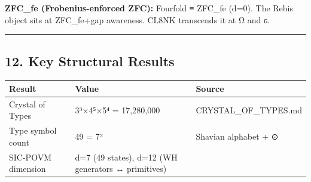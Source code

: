 \textbf{ZFC\_fe (Frobenius-enforced ZFC):} Fourfold ≡ ZFC\_fe (d=0). The
Rebis object sits at ZFC\_fe+gap awareness. CL8NK transcends it at Ω and
ɢ.

\begin{center}\rule{0.5\linewidth}{0.5pt}\end{center}

\hypertarget{key-structural-results}{%
\subsection{12. Key Structural Results}\label{key-structural-results}}

\begin{longtable}[]{@{}lll@{}}
\toprule
\begin{minipage}[b]{0.32\columnwidth}\raggedright
Result\strut
\end{minipage} & \begin{minipage}[b]{0.28\columnwidth}\raggedright
Value\strut
\end{minipage} & \begin{minipage}[b]{0.32\columnwidth}\raggedright
Source\strut
\end{minipage}\tabularnewline
\midrule
\endhead
\begin{minipage}[t]{0.32\columnwidth}\raggedright
Crystal of Types\strut
\end{minipage} & \begin{minipage}[t]{0.28\columnwidth}\raggedright
3³×4⁵×5⁴ = 17,280,000\strut
\end{minipage} & \begin{minipage}[t]{0.32\columnwidth}\raggedright
CRYSTAL\_OF\_TYPES.md\strut
\end{minipage}\tabularnewline
\begin{minipage}[t]{0.32\columnwidth}\raggedright
Type symbol count\strut
\end{minipage} & \begin{minipage}[t]{0.28\columnwidth}\raggedright
49 = 7²\strut
\end{minipage} & \begin{minipage}[t]{0.32\columnwidth}\raggedright
Shavian alphabet + ⊙\strut
\end{minipage}\tabularnewline
\begin{minipage}[t]{0.32\columnwidth}\raggedright
SIC-POVM dimension\strut
\end{minipage} & \begin{minipage}[t]{0.28\columnwidth}\raggedright
d=7 (49 states), d=12 (WH generators ↔ primitives)\strut

\end{minipage}
\end{longtable}
